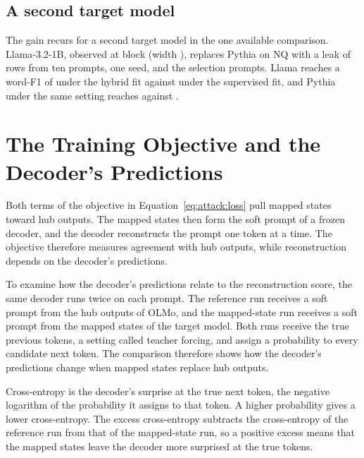 \subsection{A second target model}\label{sec:attack:llama}

The gain recurs for a second target model in the one available comparison.
Llama-3.2-1B, observed at block  (width ), replaces Pythia on NQ with a leak of  rows from ten prompts, one seed, and the selection prompts. %
Llama reaches a word-F1 of  under the hybrid fit against  under the supervised fit, and Pythia under the same setting reaches  against . %

\section{The Training Objective and the Decoder's Predictions}\label{sec:attack:teacher}

Both terms of the objective in Equation~\ref{eq:attack:loss} pull mapped states toward hub outputs.
The mapped states then form the soft prompt of a frozen decoder, and the decoder reconstructs the prompt one token at a time.
The objective therefore measures agreement with hub outputs, while reconstruction depends on the decoder's predictions.

To examine how the decoder's predictions relate to the reconstruction score, the same decoder runs twice on each prompt.
The reference run receives a soft prompt from the hub outputs of OLMo, and the mapped-state run receives a soft prompt from the mapped states of the target model.
Both runs receive the true previous tokens, a setting called teacher forcing, and assign a probability to every candidate next token.
The comparison therefore shows how the decoder's predictions change when mapped states replace hub outputs.

Cross-entropy is the decoder's surprise at the true next token, the negative logarithm of the probability it assigns to that token.
A higher probability gives a lower cross-entropy.
The excess cross-entropy subtracts the cross-entropy of the reference run from that of the mapped-state run, so a positive excess means that the mapped states leave the decoder more surprised at the true tokens.

